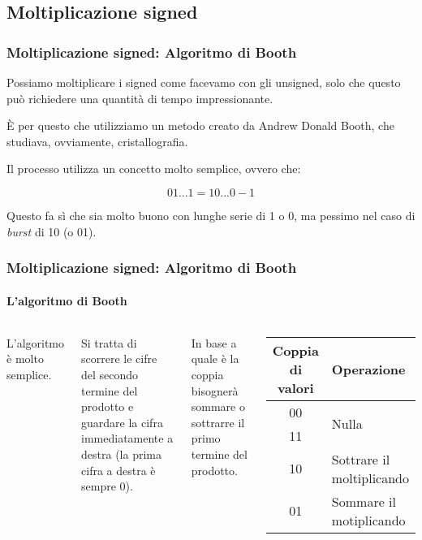 \documentclass{beamer}
\begin{document}
	\subsection{Moltiplicazione signed}  
  \begin{frame}
    \frametitle{Moltiplicazione signed: Algoritmo di Booth}    	
		Possiamo moltiplicare i signed come facevamo con gli unsigned,
		solo che questo può richiedere una quantità di tempo impressionante.
		
		\vspace{2em}
		
		È per questo che utilizziamo un metodo creato da Andrew Donald Booth, che studiava,
		ovviamente, cristallografia.
		
		\vspace{2em}
		
		Il processo utilizza un concetto molto semplice, ovvero che:
		
		$$01\text{...}1 = 10\text{...}0 - 1$$
		
		Questo fa sì che sia molto buono con lunghe serie di 1 o 0, ma pessimo nel
		caso di \emph{burst} di 10 (o 01).
  \end{frame}
  \begin{frame}
    \frametitle{Moltiplicazione signed: Algoritmo di Booth}
    \framesubtitle{L'algoritmo di Booth}
    \begin{columns}
    	  L'algoritmo è molto semplice.
    	  
    	  Si tratta di scorrere le cifre del secondo termine del
    	  prodotto e guardare la cifra immediatamente a destra
    	  (la prima cifra a destra è sempre 0).
    	  
			\vspace{2em}    	  
    	  
    	  In base a quale è la coppia bisognerà sommare o sottrarre
    	  il primo termine del prodotto.
    		\begin{center}
			\begin{tabular}{|c||p{6em}|}
				\hline				
				Coppia di valori & Operazione \\
				\hline
				00 & \multirow{2}{*}{Nulla} \\
				11 & \\
				\hline				
				10 & Sottrare il moltiplicando 	\\
				\hline				
				01 & Sommare il motiplicando 		\\
				\hline 
			\end{tabular}
			\end{center}
    \end{columns}
  \end{frame}
\end{document}
